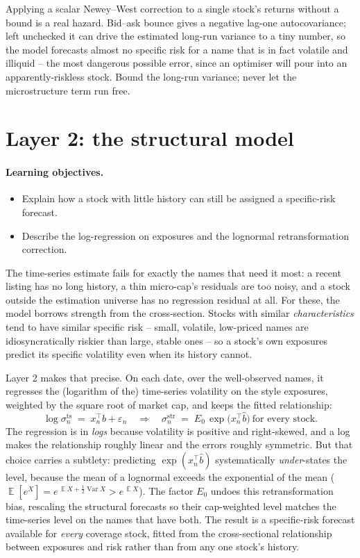 \documentclass[11pt]{article}
\theoremstyle{definition}
\theoremstyle{plain}
\theoremstyle{remark}
\DeclareMathOperator{\Var}{Var}
\DeclareMathOperator*{\avg}{\mathbb{E}}
\newcommand{\T}{^{\!\top}}
\newcommand{\half}{\tfrac12}
\begin{document}
\begin{pitfall}
Applying a scalar Newey--West correction to a single stock's returns without a bound is a real hazard. Bid--ask bounce gives a negative lag-one autocovariance; left unchecked it can drive the estimated long-run variance to a tiny number, so the model forecasts almost no specific risk for a name that is in fact volatile and illiquid -- the most dangerous possible error, since an optimiser will pour into an apparently-riskless stock. Bound the long-run variance; never let the microstructure term run free.
\end{pitfall}

\section{Layer 2: the structural model}\label{sec:struct}

\paragraph{Learning objectives.}
\begin{itemize}[leftmargin=1.4em,topsep=2pt]
  \item Explain how a stock with little history can still be assigned a specific-risk forecast.
  \item Describe the log-regression on exposures and the lognormal retransformation correction.
\end{itemize}

The time-series estimate fails for exactly the names that need it most: a recent listing has no long history, a thin micro-cap's residuals are too noisy, and a stock outside the estimation universe has no regression residual at all. For these, the model borrows strength from the cross-section. Stocks with similar \emph{characteristics} tend to have similar specific risk -- small, volatile, low-priced names are idiosyncratically riskier than large, stable ones -- so a stock's own exposures predict its specific volatility even when its history cannot.

Layer 2 makes that precise. On each date, over the well-observed names, it regresses the (logarithm of the) time-series volatility on the style exposures, weighted by the square root of market cap, and keeps the fitted relationship:
\[
\log \sigma^{\text{ts}}_n \;=\; x_n\T b + \varepsilon_n
\quad\Longrightarrow\quad
\sigma^{\text{str}}_n \;=\; E_0\,\exp\!\big(x_n\T \hat b\big)\ \text{for every stock}.
\]
The regression is in \emph{logs} because volatility is positive and right-skewed, and a log makes the relationship roughly linear and the errors roughly symmetric. But that choice carries a subtlety: predicting $\exp(x_n\T\hat b)$ systematically \emph{under}-states the level, because the mean of a lognormal exceeds the exponential of the mean ($\avg[e^X] = e^{\,\avg X + \half\Var X} > e^{\,\avg X}$). The factor $E_0$ undoes this retransformation bias, rescaling the structural forecasts so their cap-weighted level matches the time-series level on the names that have both. The result is a specific-risk forecast available for \emph{every} coverage stock, fitted from the cross-sectional relationship between exposures and risk rather than from any one stock's history.
\end{document}
